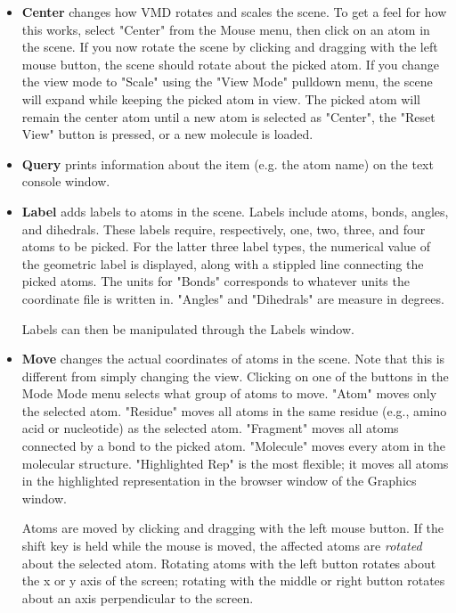 \begin{itemize}
\item {\bf Center} changes how VMD rotates and scales the scene.
To get a feel for how this works, select "Center" from the Mouse menu, then
click on an atom in the scene.  If you now rotate the scene by clicking
and dragging with the left mouse button, the scene should rotate about the
picked atom.  If you change the view mode to "Scale" using the "View Mode"
pulldown menu, the scene will expand while keeping the picked atom in view.
The picked atom will remain the center atom until a new atom is selected as
"Center", the "Reset View" button is pressed, or a new molecule is loaded.

\item {\bf Query} prints information about the item (e.g. the atom name) on the
text console window.

\item {\bf Label} adds labels to atoms in the scene.  Labels
include atoms, bonds, angles, and dihedrals.  These labels require, 
respectively, one, two, three, and four atoms to be picked. For the latter 
three label types, the numerical value of the geometric label is displayed, 
along with a stippled line connecting the picked atoms.  The units for 
"Bonds" corresponds to whatever units the coordinate file is written in. 
"Angles" and "Dihedrals" are measure in degrees.  

Labels can then be manipulated through the {\sf Labels} window.
 
\item{\bf Move} changes the actual coordinates of atoms in the scene.  Note
that this is different from simply changing the view.  Clicking on one of
the buttons in the Mode Mode menu selects what group of atoms to move.  "Atom"
moves only the selected atom.  "Residue" moves all atoms in the same residue
(e.g., amino acid or nucleotide) as the selected atom.  "Fragment" moves all 
atoms connected by a bond to the picked atom.  "Molecule" moves
every atom in the molecular structure.  "Highlighted Rep" is the most 
flexible; it moves all atoms in the highlighted representation in the
browser window of the Graphics window.  

Atoms are moved by clicking and dragging with the left mouse button.  If
the {\sf shift} key is held while the mouse is moved, the affected atoms are
{\em rotated} about the selected atom.   Rotating atoms with the left button
rotates about the x or y axis of the screen; rotating with the middle or
right button rotates about an axis perpendicular to the screen.


\end{itemize}

